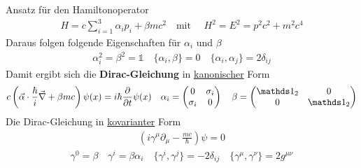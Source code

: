 




{\Huge
Ansatz für den Hamiltonoperator
\begin{align*}
H = c\sum_{i=1}^3\alpha_ip_i + \beta mc^2 \quad \text{mit } \quad H^2=E^2=p^2c^2 + m^2c^4
\end{align*}
Daraus folgen folgende Eigenschaften für \(\alpha_i\) und \(\beta\) 
\begin{align*}
\alpha^2_i=\beta^2=\mathds 1\quad \{\alpha_i,\beta\} = 0\quad \{\alpha_i,\alpha_j\}=2\delta_{ij}
\end{align*}
Damit ergibt sich die \textbf{Dirac-Gleichung} in \underline{kanonischer} Form
\begin{align*}
c\left( \vec\alpha\cdot \frac{\hbar}{i}\vec \nabla + \beta mc\right)\psi(x) = i\hbar\pdiff_t\psi(x)\quad \alpha_i =\begin{pmatrix}0&\sigma_i\\\sigma_i&0  \end{pmatrix} \quad \beta=\begin{pmatrix}\mathds 1_2&0\\0&\mathds 1_2  \end{pmatrix}
\end{align*}
Die Dirac-Gleichung in \underline{kovarianter} Form
\begin{align*}
\left( i\gamma^\mu\partial_\mu - \frac{m c}{\hbar} \right)\psi = 0
\end{align*}
\begin{align*}
\gamma^0 = \beta \quad \gamma^i = \beta\alpha_i \quad \{\gamma^i,\gamma^j\}=-2\delta_{ij} \quad \{\gamma^\mu,\gamma^\nu\}=2g^{\mu\nu}
\end{align*}


}%

